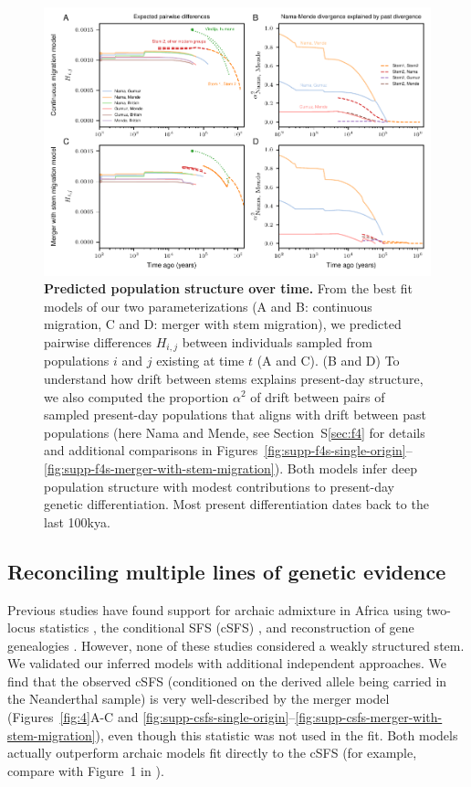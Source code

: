 \documentclass[]{article}
\begin{document}
\begin{figure}[t!]
    \centering
    \includegraphics{figures/fig3.pdf}
    \caption{
        \textbf{Predicted population structure over time.}
        From the best fit models of our two parameterizations (A and B:
        continuous migration, C and D: merger with stem migration),
        we predicted pairwise differences $H_{i,j}$ between individuals
        sampled from populations $i$ and $j$ existing at time $t$ (A and C).
        (B and D) To understand how drift between stems explains present-day structure, 
        we also computed the proportion $\alpha^2$ of drift between pairs of
        sampled present-day
        populations that aligns with drift between past populations
        (here Nama and Mende, see Section~S\ref{sec:f4} for details and additional
        comparisons in Figures~\ref{fig:supp-f4s-single-origin}--\ref{fig:supp-f4s-merger-with-stem-migration}).
        Both models infer deep population structure with modest contributions to
        present-day genetic differentiation.
        Most present differentiation dates back to the last 100kya.
    }
    \label{fig:3}
\end{figure}

\subsection*{Reconciling multiple lines of genetic evidence}

Previous studies have found support for archaic admixture in Africa using
two-locus statistics \citep{Hsieh2016-gk,Ragsdale2019-nt}, the conditional SFS
(cSFS) \citep{Durvasula2020-td}, and reconstruction of gene genealogies
\citep{Speidel2019-nj}. However, none of these studies considered a weakly
structured stem. We validated our inferred models with additional independent
approaches. We find that the observed cSFS (conditioned on the derived allele
being carried in the Neanderthal sample) is very well-described by the merger
model (Figures~\ref{fig:4}A-C and
\ref{fig:supp-csfs-single-origin}--\ref{fig:supp-csfs-merger-with-stem-migration}),
even though this statistic was not used in the fit. Both models actually outperform
archaic models fit directly to the cSFS (for example, compare with Figure~1 in
\citet{Durvasula2020-td}).
\end{document}
